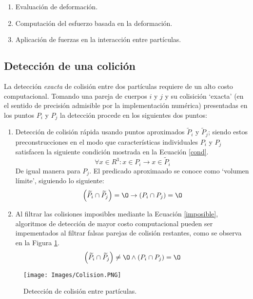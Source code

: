 \begin{enumerate}
	\item Evaluaci\'on de deformaci\'on.
	\item Computaci\'on del esfuerzo basada en la deformaci\'on.
	\item Aplicaci\'on de fuerzas en la interacci\'on entre part\'iculas.
\end{enumerate}

\subsection{Detecci\'on de una colici\'on} \label{detect}

\noindent
\justify

La detecci\'on \textit{exacta} de colisi\'on entre dos part\'iculas requiere de un alto costo computacional. Tomando una pareja de cuerpos $i$ y $j$ y su colisici\'on `exacta' (en el sentido de precisi\'on admisible por la implementaci\'on num\'erica) presentadas en los puntos $P_i$ y $P_j$ la detecci\'on procede en los siguientes dos puntos:

\begin{enumerate}
	\item Detecci\'on de colisi\'on r\'apida usando puntos aproximados $\widetilde{P}_i$ y $\widetilde{P}_j$; siendo estos preconstrucciones en el modo que caracter\'isticas individuales $P_i$ y $P_j$ satisfacen la siguiente condici\'on mostrada en la Ecuaci\'on \ref{cond}.
	\begin{equation}
		\forall x \in R^3 : x \in P_i \rightarrow x \in \widetilde{P}_i
		\label{cond}
	\end{equation}
	De igual manera para $P_j$. El predicado aproximaado se conoce como `volumen l\'imite', siguiendo lo siguiente:
	\begin{equation}
		\left(\widetilde{P}_i \cap \widetilde{P}_j \right) = {\O} \rightarrow \left( P_i \cap P_j \right) = {\O}
		\label{imposible}
	\end{equation}
	\item Al filtrar las colisiones imposibles mediante la Ecuaci\'on \ref{imposible}, algoritmos de detecci\'on de mayor costo computacional pueden ser impementados al filtrar falsas parejas de colisi\'on restantes, como se observa en la Figura \ref{colision}.
	\begin{equation}
		\left(\widetilde{P}_i \cap \widetilde{P}_j \right) \neq {\O} \wedge \left(P_i \cap P_j \right) = {\O}
	\end{equation}
\end{enumerate}

\begin{figure}[h!]
\centering
\texttt{[image: Images/Colision.PNG]}
\caption{Detecci\'on de colisi\'on entre part\'iculas.}
\label{colision}
\end{figure}